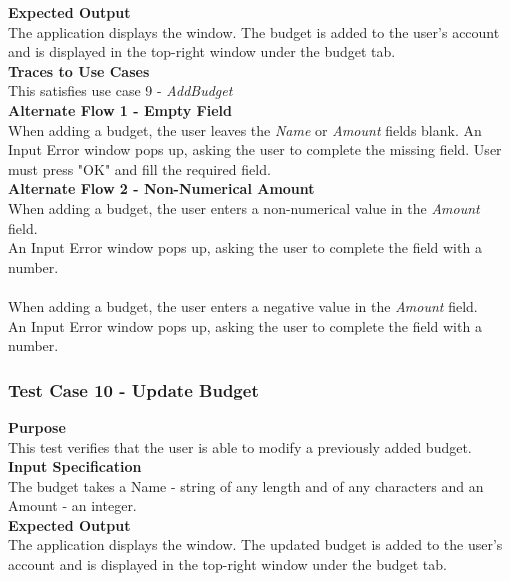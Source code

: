 \documentclass[12pt]{article}
\begin{document}
{\bf Expected Output}\\
The application displays the window.
The budget is added to the user's account and is displayed in the top-right window
under the budget tab.\\

\noindent
{\bf Traces to Use Cases}\\
This satisfies use case 9 - \textit{AddBudget}\\

\noindent
{\bf Alternate Flow 1 - Empty Field}\\
When adding a budget, the user leaves the \textit{Name} or \textit{Amount} fields blank.
An Input Error window pops up, asking the user to complete the missing field. User must press "OK" and fill the required field.\\

\noindent
{\bf Alternate Flow 2 - Non-Numerical Amount}\\
When adding a budget, the user enters a non-numerical value in the \textit{Amount} field. \\
An Input Error window pops up, asking the user to complete the field with a number. \\

\\
When adding a budget, the user enters a negative value in the \textit{Amount} field. \\
An Input Error window pops up, asking the user to complete the field with a number. \\

\clearpage

\subsubsection{Test Case 10 - Update Budget} \label{TC-10}

{\bf Purpose}\\
This test verifies that the user is able to modify a previously added budget.   \\               

{\bf Input Specification}\\
The budget takes a Name - string of any length and of any characters
and an Amount - an integer.\\

\noindent
{\bf Expected Output}\\
The application displays the window.
The updated budget is added to the user's account and is displayed in the top-right window
under the budget tab.\\
\end{document}
